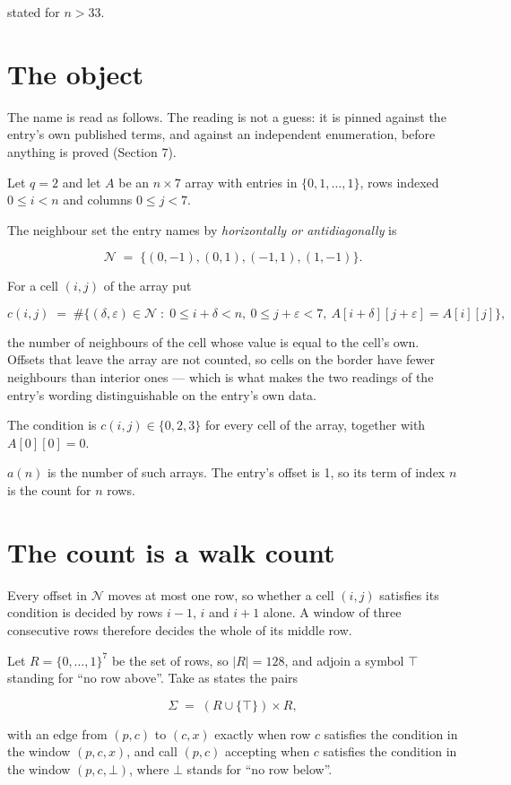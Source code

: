 \documentclass[11pt]{article}
\theoremstyle{definition}
\begin{document}
stated for $n > 33$.

\section{The object}

The name is read as follows. The reading is not a guess: it is pinned against the entry's own published terms, and against an independent enumeration, before anything is proved (Section 7).

Let $q = 2$ and let $A$ be an $n \times 7$ array with entries in $\{0,1,\dots,1\}$, rows indexed $0 \le i < n$ and columns $0 \le j < 7$.

The neighbour set the entry names by {\itshape horizontally or antidiagonally} is

\[\mathcal{N} \;=\; \{(0,-1), (0,1), (-1,1), (1,-1)\}.\]

For a cell $(i,j)$ of the array put

\[c(i,j) \;=\; \#\bigl\{(\delta,\varepsilon)\in\mathcal{N} \;:\; 0\le i+\delta<n,\ 0\le j+\varepsilon<7,\ A[i+\delta][j+\varepsilon] = A[i][j]\bigr\},\]

the number of neighbours of the cell whose value is equal to the cell's own. Offsets that leave the array are not counted, so cells on the border have fewer neighbours than interior ones --- which is what makes the two readings of the entry's wording distinguishable on the entry's own data.

The condition is $c(i,j) \in \{0, 2, 3\}$ for every cell of the array, together with $A[0][0]=0$.

$a(n)$ is the number of such arrays. The entry's offset is 1, so its term of index $n$ is the count for $n$ rows.

\section{The count is a walk count}

Every offset in $\mathcal{N}$ moves at most one row, so whether a cell $(i,j)$ satisfies its condition is decided by rows $i-1$, $i$ and $i+1$ alone. A window of three consecutive rows therefore decides the whole of its middle row.

Let $R = \{0,\dots,1\}^{7}$ be the set of rows, so $|R| = 128$, and adjoin a symbol $\top$ standing for ``no row above''. Take as states the pairs

\[\Sigma \;=\; (R \cup \{\top\}) \times R,\]

with an edge from $(p,c)$ to $(c,x)$ exactly when row $c$ satisfies the condition in the window $(p,c,x)$, and call $(p,c)$ accepting when $c$ satisfies the condition in the window $(p,c,\bot)$, where $\bot$ stands for ``no row below''.
\end{document}
